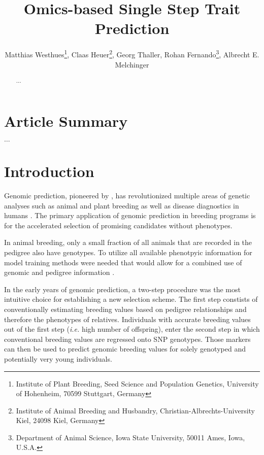 \documentclass[12pt,titlepage]{article}
\title{Omics-based Single Step Trait Prediction}
\author{
  Matthias Westhues\thanks{Institute of Plant Breeding, Seed Science and Population Genetics, University of Hohenheim, 70599 Stuttgart, Germany},
  Claas Heuer\thanks{Institute of Animal Breeding and Husbandry, Christian-Albrechts-University Kiel, 24098 Kiel, Germany},
  Georg Thaller\samethanks[2],
  Rohan Fernando\thanks{Department of Animal Science, Iowa State University, 50011 Ames, Iowa, U.S.A.},
  Albrecht E. Melchinger\samethanks[1]
}
\begin{document}
\maketitle
\doublespacing
\linenumbers



\begin{abstract}

  $\dots$

\end{abstract}



\section{Article Summary}
$\dots$



\section{Introduction} 
Genomic prediction, pioneered by , has revolutionized
multiple areas of genetic analyses such as animal and plant breeding
\cite{DeLosCampos2013} as well as disease diagnostics in humans 
\cite{DeLosCampos2010,Vazquez2016}.
The primary application of genomic prediction in breeding programs is for the 
accelerated selection of promising candidates without phenotypes.

In animal breeding, only a small fraction of all animals that are recorded in
the pedigree also have genotypes.
To utilize all available phenotpyic information for model training methods were 
needed that would allow for a combined use of genomic and pedigree information 
\cite{Hayes2009a,VanRaden2009}.

In the early years of genomic prediction, a two-step procedure was the most
intuitive choice for establishing a new selection scheme.
The first step constists of conventionally estimating breeding values based on
pedigree relationships and therefore the phenotypes of relatives.
Individuals with accurate breeding values out of the first step (\textit{i.e.}
high number of offspring), enter the second step in which conventional breeding
values are regressed onto SNP genotypes. 
Those markers can then be used to predict genomic breeding values for solely
genotyped and potentially very young individuals.
\end{document}
